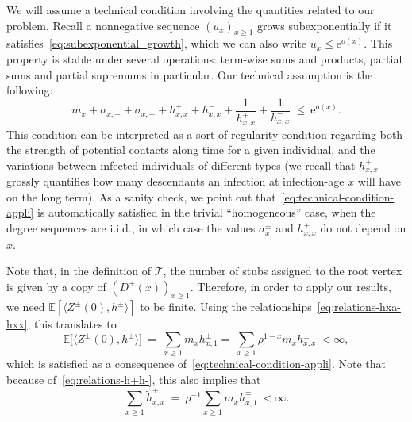 \begin{refsegment}
We will assume a technical condition involving the quantities related
to our problem. Recall a nonnegative sequence $(u_x)_{x\geq 1}$
grows subexponentially if it satisfies~\eqref{eq:subexponential_growth}, which we can also write $u_x\leq \mathrm{e}^{o(x)}$.
This property is stable under several operations: term-wise sums and
products, partial sums and partial supremums in particular. Our
technical assumption is the following:
\begin{equation}
  \label{eq:technical-condition-appli}
    m_x + \sigma_{x,-}+\sigma_{x,+} + h^+_{x,x}+h^-_{x,x} +
    \frac{1}{h^+_{x,x}} + \frac{1}{h^-_{x,x}} \ \leq \ \mathrm{e}^{o(x)}.
\end{equation}
This condition can be interpreted as a sort of regularity condition
regarding both the strength of potential contacts along time for a
given individual, and the variations between infected individuals of
different types (we recall that $h_{x,x}^+$ grossly quantifies how
many descendants an infection at infection-age $x$ will have on the
long term). As a sanity check, we point out
that~\eqref{eq:technical-condition-appli} is automatically satisfied
in the trivial ``homogeneous'' case, when the degree sequences are
i.i.d., in which case the values $\sigma^\pm_x$ and $h^\pm_{x,x}$ do
not depend on $x$.

Note that, in the definition of $\mathcal{T}$, the number of stubs
assigned to the root vertex is given by a copy of $(D^\pm(x))_{x\geq
  1}$. Therefore, in order to apply our results, we need 
$\mathbb{E}[\langle Z^\pm(0), h^\pm\rangle]$ to be finite. Using the
relationships~\eqref{eq:relations-hxa-hxx}, this translates to
\begin{equation*}
  \mathbb{E}\big[\langle Z^\pm(0), h^\pm\rangle\big] \
  =\ \sum_{x\geq 1} m_x h^\pm_{x,1}
  =\ \sum_{x\geq 1} \rho^{1-x}m_x h^\pm_{x,x} \ < \infty,
\end{equation*}
which is satisfied as a consequence
of~\eqref{eq:technical-condition-appli}.
Note that because of~\eqref{eq:relations-h+h-}, this also implies that
\begin{equation}
  \label{eq:sum_tilde_h_finite}
  \sum_{x\geq 1} \tilde{h}^\pm_{x,x} \ =\ \rho^{-1} \sum_{x\geq 1} m_x
  h^{\mp}_{x,1} \ < \infty.
\end{equation}



\end{refsegment}
